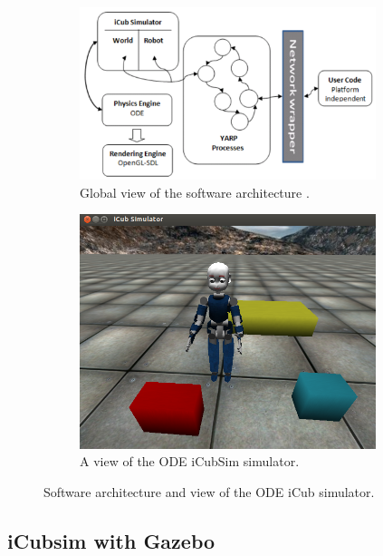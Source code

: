 \documentclass[12pt,a4paper,twoside]{article}
\begin{document}
\begin{figure}[h]
\begin{center}
\begin{subfigure}[b]{0.49\textwidth}
\centering
\includegraphics[width=0.95\textwidth]{iCubSim-arch.png} 
\caption{Global view of the software architecture \cite{tikhanoff2008open}.}
\label{fig:iCubSim-arch}
\end{subfigure}
\begin{subfigure}[b]{0.49\textwidth}
\centering
\includegraphics[width=0.95\textwidth]{sim_ode.png}
\caption{A view of the ODE iCubSim simulator.}
\label{fig:iCubSim-view}
\end{subfigure}
\caption{Software architecture and view of the ODE iCub simulator.}
\end{center}
\end{figure}

\subsection{iCubsim with Gazebo}
\end{document}
